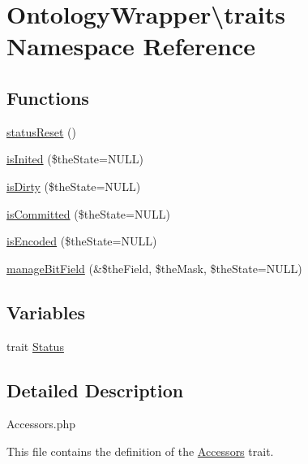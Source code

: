 \hypertarget{namespace_ontology_wrapper_1_1traits}{\section{Ontology\-Wrapper\textbackslash{}traits Namespace Reference}
\label{namespace_ontology_wrapper_1_1traits}
}
\subsection*{Functions}
\begin{DoxyCompactItemize}
\item 
\hyperlink{namespace_ontology_wrapper_1_1traits_acadfee775efc8ade32f530661bce6a4c}{status\-Reset} ()
\item 
\hyperlink{namespace_ontology_wrapper_1_1traits_a43007c8c10e6a39efb3fda133acd66a5}{is\-Inited} (\$the\-State=N\-U\-L\-L)
\item 
\hyperlink{namespace_ontology_wrapper_1_1traits_ab3e0667a6043c3358abbde6f4d961f74}{is\-Dirty} (\$the\-State=N\-U\-L\-L)
\item 
\hyperlink{namespace_ontology_wrapper_1_1traits_a36786d51cf29964961c7adf9ef4217ea}{is\-Committed} (\$the\-State=N\-U\-L\-L)
\item 
\hyperlink{namespace_ontology_wrapper_1_1traits_a089fd27758be34a128040793eab24d17}{is\-Encoded} (\$the\-State=N\-U\-L\-L)
\item 
\hyperlink{namespace_ontology_wrapper_1_1traits_a938e7554a77c653fd269f4f1e97e21f6}{manage\-Bit\-Field} (\&\$the\-Field, \$the\-Mask, \$the\-State=N\-U\-L\-L)
\end{DoxyCompactItemize}
\subsection*{Variables}
\begin{DoxyCompactItemize}
\item 
trait \hyperlink{namespace_ontology_wrapper_1_1traits_abc477d51641d17c4e149e2cd0093c771}{Status}
\end{DoxyCompactItemize}


\subsection{Detailed Description}
Accessors.\-php

This file contains the definition of the \hyperlink{}{Accessors} trait.

